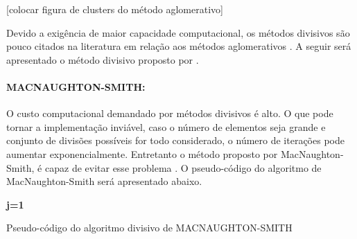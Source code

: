 [colocar figura de clusters do método aglomerativo]

Devido a exigência de maior capacidade computacional, os métodos divisivos são pouco citados na literatura em relação aos métodos aglomerativos  \cite{kaufman1990finding}. A seguir será apresentado o método divisivo proposto por \cite{macnaughton1964dissimilarity}. 

\paragraph{MACNAUGHTON-SMITH:}

O custo computacional demandado por métodos divisivos é alto. O que pode tornar a implementação inviável, caso o número de elementos seja grande e conjunto de divisões possíveis for todo considerado, o número de iterações pode aumentar exponencialmente. Entretanto o método proposto por MacNaughton-Smith, é capaz de evitar esse problema \cite{Doni:2004}. O pseudo-código do algoritmo de MacNaughton-Smith será apresentado abaixo.





\IncMargin{1em}
\begin{algorithm}[H]
\SetAlgoLined
{}
\textbf{j=1}\\
\caption{Pseudo-código do algoritmo divisivo de MACNAUGHTON-SMITH}
\end{algorithm}
\DecMargin{2em}
\newpage
